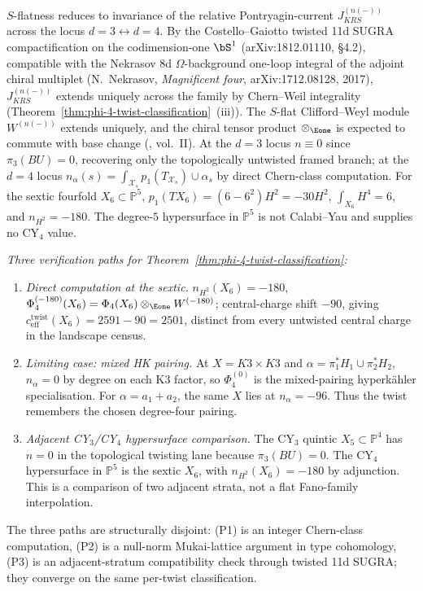 \begin{remark}
$S$-flatness reduces to invariance of the relative Pontryagin-current
$J^{(n(-))}_{KRS}$ across the locus $d = 3 \leftrightarrow d = 4$. By the
Costello--Gaiotto twisted 11d SUGRA compactification on the codimension-one
$\bS^1$ (arXiv:1812.01110, §4.2), compatible with the Nekrasov 8d
$\Omega$-background one-loop integral of the adjoint chiral multiplet
(N.\ Nekrasov, \emph{Magnificent four}, arXiv:1712.08128, 2017),
$J^{(n(-))}_{KRS}$ extends uniquely across the family by Chern--Weil
integrality \textup{(}Theorem~\ref{thm:phi-4-twist-classification}~(iii)\textup{)}. The
$S$-flat Clifford--Weyl module $W^{(n(-))}$ extends uniquely, and the
chiral tensor product $\otimes_{\Eone}$ is expected to commute with base change
(\cite{CostelloGwilliam}, vol.\ II). At the $d = 3$ locus $n \equiv 0$ since
$\pi_3(BU) = 0$, recovering only the topologically untwisted framed branch; at the $d = 4$ locus
\(n_\alpha(s)=\int_{\mathcal{X}_s}p_1(T_{\mathcal X_s})\cup\alpha_s\) by direct Chern-class
computation. For the sextic fourfold \(X_6\subset\mathbb P^5\),
\(p_1(TX_6)=(6-6^2)H^2=-30H^2\), \(\int_{X_6}H^4=6\), and
\(n_{H^2}=-180\). The degree-\(5\) hypersurface in \(\mathbb P^5\) is not
Calabi--Yau and supplies no CY$_4$ value.
\end{remark}

\noindent\textit{Three verification paths for
Theorem~\ref{thm:phi-4-twist-classification}:}
\begin{enumerate}[label=\textup{(}P\arabic*\textup{)}]
 \item \emph{Direct computation at the sextic.}
 \(n_{H^2}(X_6)=-180\), $\Phi_4^{(-180)}(X_6) = \Phi_4(X_6) \otimes_{\Eone}
 W^{(-180)}$; central-charge shift $-90$, giving
 $c^{\mathrm{twist}}_{\mathrm{eff}}(X_6) = 2591 - 90 = 2501$, distinct from
 every untwisted central charge in the landscape census.
 \item \emph{Limiting case: mixed HK pairing.} At \(X=K3\times K3\) and
 \(\alpha=\pi_1^*H_1\cup\pi_2^*H_2\), \(n_\alpha=0\) by degree on each
 K3 factor, so \(\Phi_4^{(0)}\) is the mixed-pairing hyperk\"ahler
 specialisation. For \(\alpha=a_1+a_2\), the same \(X\) lies at
 \(n_\alpha=-96\). Thus the twist remembers the chosen degree-four
 pairing.
 \item \emph{Adjacent CY$_3$/CY$_4$ hypersurface comparison.}
 The CY$_3$ quintic \(X_5\subset\mathbb P^4\) has \(n=0\) in the
 topological twisting lane because \(\pi_3(BU)=0\). The CY$_4$
 hypersurface in \(\mathbb P^5\) is the sextic \(X_6\), with
 \(n_{H^2}(X_6)=-180\) by adjunction. This is a comparison of two adjacent
 strata, not a flat Fano-family interpolation.
\end{enumerate}
The three paths are structurally disjoint: (P1) is an integer Chern-class
computation, (P2) is a null-norm Mukai-lattice argument in type cohomology,
(P3) is an adjacent-stratum compatibility check through twisted 11d SUGRA; they
converge on the same per-twist classification.

